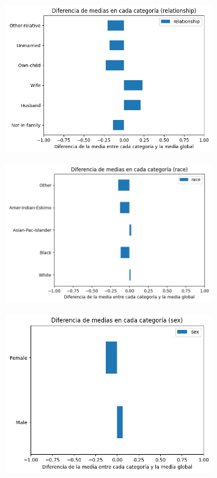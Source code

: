 \documentclass{article}
\begin{document}
	\begin{figure}[H]
		\centering
		\includegraphics[width=0.8\textwidth]{media_relationship.png}
	\end{figure}
	
	\begin{figure}[H]
		\centering
		\includegraphics[width=0.8\textwidth]{media_race.png}
	\end{figure}
	
	\begin{figure}[H]
		\centering
		\includegraphics[width=0.8\textwidth]{media_sex.png}
	\end{figure}
	
\end{document}
